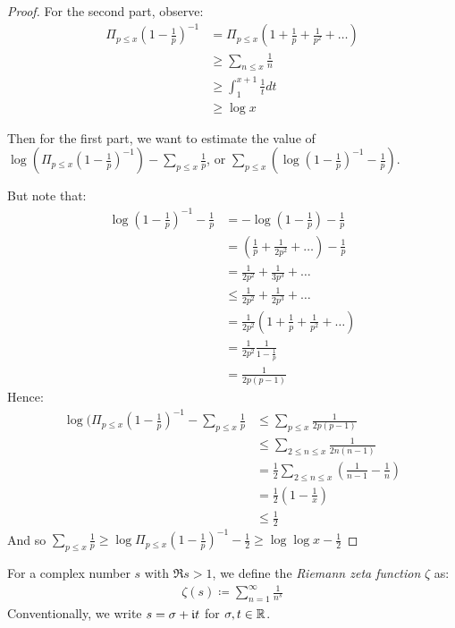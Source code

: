 \documentclass[10pt,a4paper]{article}
\begin{document}
\begin{proof}
For the second part, observe:
\begin{align*}
\Pi_{p\leq x} (1-\frac{1}{p})^{-1} &= \Pi_{p\leq x}(1+\frac{1}{p}+\frac{1}{p^2}+\ldots)\\
&\geq \sum_{n \leq x} \frac{1}{n}\\
&\geq \int_1^{x+1} \frac{1}{t} dt\\
&\geq \log x
\end{align*}

Then for the first part, we want to estimate the value of $\log\left(\Pi_{p\leq x}(1-\frac{1}{p})^{-1}\right) - \sum_{p\leq x}\frac{1}{p}$, or $\sum_{p\leq x}\left(\log(1-\frac{1}{p})^{-1} - \frac{1}{p}\right)$.

But note that:
\begin{align*}
\log(1-\frac{1}{p})^{-1} - \frac{1}{p} &= -\log(1-\frac{1}{p}) - \frac{1}{p}\\
&= (\frac{1}{p} + \frac{1}{2p^2} + \ldots ) -\frac{1}{p}\\
&= \frac{1}{2p^2} + \frac{1}{3p^3} + \ldots \\
&\leq \frac{1}{2p^2} + \frac{1}{2p^3} + \ldots \\
&= \frac{1}{2p^2}\left(1+\frac{1}{p}+\frac{1}{p^2}+\ldots\right)\\
&= \frac{1}{2p^2}\frac{1}{1-\frac{1}{p}}\\
&= \frac{1}{2p(p-1)}
\end{align*}
Hence:
\begin{align*}
\log(\Pi_{p\leq x} (1-\frac{1}{p})^{-1} - \sum_{p\leq x}\frac{1}{p} &\leq \sum_{p\leq x} \frac{1}{2p(p-1)}\\
&\leq \sum_{2\leq n\leq x} \frac{1}{2n(n-1)}\\
&= \frac{1}{2} \sum_{2\leq n\leq x} (\frac{1}{n-1} - \frac{1}{n})\\
&= \frac{1}{2}(1-\frac{1}{x})\\
&\leq \frac{1}{2}
\end{align*}
And so $\sum_{p\leq x}\frac{1}{p} \geq \log \Pi_{p\leq x} (1-\frac{1}{p})^{-1} - \frac{1}{2} \geq \log\log x - \frac{1}{2}$
\end{proof}

For a complex number $s$ with $\Re s > 1$, we define the \emph{Riemann zeta function} $\zeta$ as:
\begin{align*}
\zeta(s) \coloneqq \sum_{n=1}^\infty \frac{1}{n^s}
\end{align*}
Conventionally, we write $s = \sigma + \mathfrak{i} t$ for $\sigma, t \in \mathbb{R}$.
\end{document}
